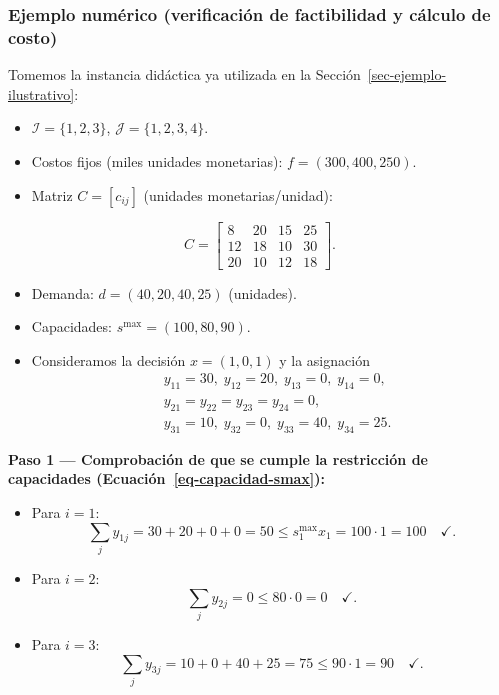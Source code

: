 \documentclass[
  spanish,
  us-letterpaper,
]{scrreprt}
\providecommand{\tightlist}{%
  \setlength{\itemsep}{0pt}\setlength{\parskip}{0pt}}
\numberwithin{equation}{section}
\begin{document}
\subsubsection{Ejemplo numérico (verificación de factibilidad y cálculo
de
costo)}\label{ejemplo-numuxe9rico-verificaciuxf3n-de-factibilidad-y-cuxe1lculo-de-costo}

Tomemos la instancia didáctica ya utilizada en la
Sección~\ref{sec-ejemplo-ilustrativo}:

\begin{itemize}
\tightlist
\item
  \(\mathcal{I}=\{1,2,3\}\), \(\mathcal{J}=\{1,2,3,4\}\).
\item
  Costos fijos (miles unidades monetarias): \(f=(300,400,250)\).
\item
  Matriz \(C=[c_{ij}]\) (unidades monetarias/unidad):
\end{itemize}

\[
C=
\begin{bmatrix}
8 & 20 & 15 & 25 \\
12 & 18 & 10 & 30 \\
20 & 10 & 12 & 18
\end{bmatrix}.
\]

\begin{itemize}
\tightlist
\item
  Demanda: \(d=(40,20,40,25)\) (unidades).
\item
  Capacidades: \(s^{\max}=(100,80,90)\).
\item
  Consideramos la decisión \(x=(1,0,1)\) y la asignación \[
  \begin{aligned}
  &y_{11}=30,\; y_{12}=20,\; y_{13}=0,\; y_{14}=0,\\
  &y_{21}=y_{22}=y_{23}=y_{24}=0,\\
  &y_{31}=10,\; y_{32}=0,\; y_{33}=40,\; y_{34}=25.
  \end{aligned}
  \]
\end{itemize}

\textbf{Paso 1 --- Comprobación de que se cumple la restricción de
capacidades (Ecuación~\ref{eq-capacidad-smax}):}

\begin{itemize}
\tightlist
\item
  Para \(i=1\): \[
  \sum_j y_{1j}=30+20+0+0=50 \le s_1^{\max} x_1 = 100\cdot 1 = 100\quad\checkmark.
  \]
\item
  Para \(i=2\): \[
  \sum_j y_{2j}=0 \le 80\cdot 0 = 0\quad\checkmark.
  \]
\item
  Para \(i=3\): \[
  \sum_j y_{3j}=10+0+40+25=75 \le 90\cdot 1 = 90\quad\checkmark.
  \]
\end{itemize}
\end{document}
